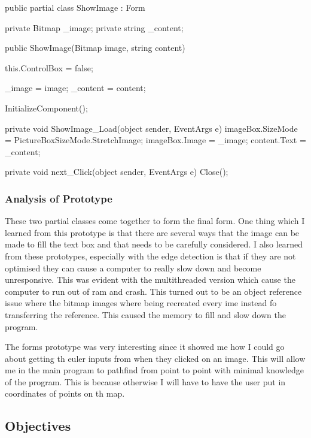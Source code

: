 \begin{FlushLeft}
\begin{cscode}
public partial class ShowImage : Form
{
    private Bitmap _image;
    private string _content;

    public ShowImage(Bitmap image, string content)
    {
        this.ControlBox = false;

        _image = image;
        _content = content;

        InitializeComponent();
    }

    private void ShowImage_Load(object sender, EventArgs e)
    {
        imageBox.SizeMode = PictureBoxSizeMode.StretchImage;
        imageBox.Image = _image;
        content.Text = _content;
    }

    private void next_Click(object sender, EventArgs e)
    {
        Close();
    }
}
        \end{cscode}

        \subsubsection{Analysis of Prototype}

        These two partial classes come together to form the final form. One thing which I learned from this prototype is that there are several ways that the image can be made to fill the text box and that needs to be carefully considered. I also learned from these prototypes, especially with the edge detection is that if they are not optimised they can cause a computer to really slow down and become unresponsive. This was evident with the multithreaded version which cause the computer to run out of ram and crash. This turned out to be an object reference issue where the bitmap images where being recreated every ime instead fo transferring the reference. This caused the memory to fill and slow down the program. \\ \bk

        The forms prototype was very interesting since it showed me how I could go about getting th euler inputs from when they clicked on an image. This will allow me in the main program to pathfind from point to point with minimal knowledge of the program. This is because otherwise I will have to have the user put in coordinates of points on th map. \\
            

        \subsection{Objectives}
        \normalsize
        

\end{FlushLeft}
